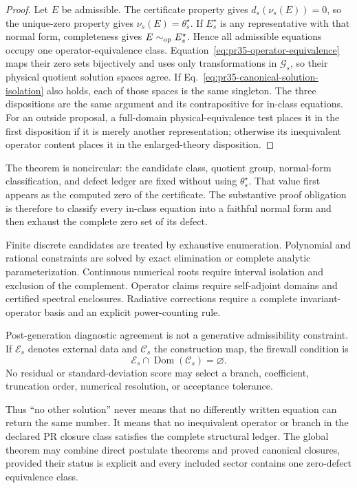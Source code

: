 \begin{proof}
Let $E$ be admissible.  The certificate property gives
$d_s(\nu_s(E))=0$, so the unique-zero property gives
$\nu_s(E)=\theta_s^\star$.  If $E_s^\star$ is any representative with that
normal form, completeness gives $E\sim_{\rm op}E_s^\star$.  Hence all
admissible equations occupy one operator-equivalence class.
Equation~\eqref{eq:pr35-operator-equivalence} maps their zero sets
bijectively and uses only transformations in $\mathcal G_s$, so their physical
quotient solution spaces agree.  If
Eq.~\eqref{eq:pr35-canonical-solution-isolation} also holds, each of those
spaces is the same singleton.  The three dispositions are the same argument
and its contrapositive for in-class equations.  For an outside proposal, a
full-domain physical-equivalence test places it in the first disposition if it
is merely another representation; otherwise its inequivalent operator content
places it in the enlarged-theory disposition.
\end{proof}

The theorem is noncircular: the candidate class, quotient group, normal-form
classification, and defect ledger are fixed without using
$\theta_s^\star$.  That value first appears as the computed zero of the
certificate.  The substantive proof obligation is therefore to classify every
in-class equation into a faithful normal form and then exhaust the complete
zero set of its defect.

Finite discrete candidates are treated by exhaustive enumeration. Polynomial
and rational constraints are solved by exact elimination or complete analytic
parameterization. Continuous numerical roots require interval isolation and
exclusion of the complement. Operator claims require self-adjoint domains and
certified spectral enclosures. Radiative corrections require a complete
invariant-operator basis and an explicit power-counting rule.

Post-generation diagnostic agreement is not a generative admissibility
constraint. If
\(\mathcal E_s\) denotes external data and \(\mathcal C_s\) the construction
map, the firewall condition is
\begin{equation}
\mathcal E_s\cap\operatorname{Dom}(\mathcal C_s)=\varnothing .
\end{equation}
No residual or standard-deviation score may select a branch, coefficient,
truncation order, numerical resolution, or acceptance tolerance.

Thus ``no other solution'' never means that no differently written equation
can return the same number.  It means that no inequivalent operator or branch
in the declared PR closure class satisfies the complete structural ledger.
The global theorem may combine direct postulate theorems and proved canonical
closures, provided their status is explicit and every included sector contains
one zero-defect equivalence class.
